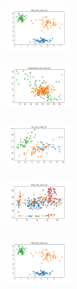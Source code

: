 \begin{figure}[H]
    \begin{subfigure}
        \centering
        \includegraphics[width=0.234\textwidth]{img/am01/rand_set_const_20_277451237_clust.png}
    \end{subfigure}
    \hfill
    \begin{subfigure}
        \centering
        \includegraphics[width=0.234\textwidth]{img/am01/newthyroid_set_const_20_277451237_clust.png}
    \end{subfigure}
    \hfill
    \begin{subfigure}
        \centering
        \includegraphics[width=0.234\textwidth]{img/am01/iris_set_const_20_49258669_clust.png}
    \end{subfigure}
    \hfill
    \begin{subfigure}
        \centering
        \includegraphics[width=0.234\textwidth]{img/am01/ecoli_set_const_20_49258669_clust.png}
    \end{subfigure}
    \hfill
    \begin{subfigure}
        \centering
        \includegraphics[width=0.234\textwidth]{img/am01/rand_set_const_20_49258669_clust.png}
    \end{subfigure}
    \hfill
    \begin{subfigure}
        \centering

\end{subfigure}
\end{figure}
